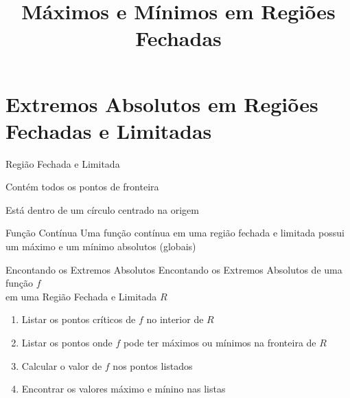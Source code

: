 
\usepackage{calculo_varias_variaveis-1}

\title {Máximos e Mínimos em Regiões Fechadas}



\addtitle

\section{Extremos Absolutos em Regiões Fechadas e Limitadas}


\begin{frame}{Região Fechada e Limitada}
  \begin{description}[<+->]
    \item[Fechada] Contém todos os pontos de fronteira
    \item[Limitada] Está dentro de um círculo centrado na origem
  \end{description}
\end{frame}

\begin{frame}{Função Contínua}
  Uma função contínua em uma região fechada e limitada possui um máximo e um
  mínimo absolutos (globais)
\end{frame}

\begin{frame}{Encontando os Extremos Absolutos}
  Encontando os Extremos Absolutos de uma função $f$ \\
  em uma Região Fechada e Limitada $R$
  \pause
  \begin{enumerate}[<+->]
    \item Listar os pontos críticos de $f$ no interior de $R$
    \item Listar os pontos onde $f$ pode ter máximos ou mínimos na fronteira de $R$
    \item Calcular o valor de $f$ nos pontos listados
    \item Encontrar os valores máximo e mínino nas listas
  \end{enumerate}
\end{frame}

